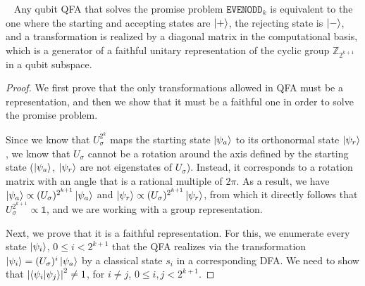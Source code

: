 \documentclass[../main.tex]{subfiles}
\begin{document}
\begin{theorem}~\label{thm:UnaryQFAself-testing} Any qubit QFA that solves the promise problem $\mathtt{EVENODD}_k$  is equivalent to the one where the starting and accepting states are $\ket{+}$, the rejecting state is $\ket{-}$, and a transformation is realized by a diagonal matrix in the computational basis, which is a generator of a faithful unitary representation of the cyclic group $\mathbb{Z}_{2^{k+1}}$ in a qubit subspace. 
\end{theorem}
\begin{proof}
We first prove that the only transformations allowed in QFA must be a representation, and then we show that it must be a faithful one in order to solve the promise problem. 

Since we know that $U_\sigma^{2^{k}}$ maps the starting state $\ket{\psi_a}$  to its orthonormal state $\ket{\psi_r}$, we know that $U_\sigma$ cannot be a rotation around the axis defined by the starting state ($\ket{\psi_a}$, $\ket{\psi_r}$ are not eigenstates of $U_\sigma$). Instead, it corresponds to a rotation matrix with an angle that is a rational multiple of $2\pi$. As a result, we have $\ket{\psi_a}\propto(U_\sigma)^{2^{k+1}} \ket{\psi_a}$ and $\ket{\psi_r}\propto(U_\sigma)^{2^{k+1}} \ket{\psi_r}$, from which it directly follows that $U_\sigma^{2^{k+1}} \propto \mathds{1}$, and we are working with a group representation. 

Next, we prove that it is a faithful representation. For this, we enumerate every state  $\ket{\psi_i}$, $0 \leq i< 2^{k+1}$  that the QFA realizes via the transformation $\ket{\psi_i}=(U_\sigma)^i \ket{\psi_a}$ by a classical state $s_i$ in a corresponding DFA. 
We need to show that $\left|\braket{\psi_i}{\psi_j}\right|^2\neq 1$, for $i\neq j$, $0 \leq i,j< 2^{k+1}$.


\end{proof}
\end{document}

